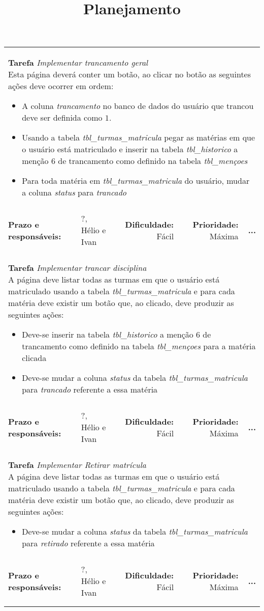 \documentclass{article}
\title{Planejamento}
\date{}
\newcommand{\pendente}{\textbf{...}}
\newenvironment{tarefas}{\begin{longtable}{llrrr}}{\end{longtable}}
\newcommand{\tarefa}[7]{
  \multicolumn{5}{l}{\parbox{15cm}{\textbf{Tarefa} \emph{#1}\\ #2}}
	\\\\\hline\textbf{Prazo e responsáveis:} & #3, #4 & \textbf{Dificuldade:} #5 & \textbf{Prioridade:} #6 & #7\\\hline\\
}
\begin{document}
  \maketitle
  \begin{tarefas}
	  \tarefa{Implementar trancamento geral}{
	    Esta página deverá conter um botão, ao clicar no botão as seguintes ações deve ocorrer em ordem:
	    \begin{itemize}
	      \item A coluna \textit{trancamento} no banco de dados do usuário que trancou deve ser definida como $1$.
	      \item Usando a tabela \textit{tbl\_turmas\_matricula} pegar as matérias em que o usuário está matriculado e inserir na tabela \textit{tbl\_historico} a menção $6$ de trancamento como definido na tabela \textit{tbl\_mençoes}
	      \item Para toda matéria em \textit{tbl\_turmas\_matricula} do usuário, mudar a coluna \textit{status} para \textit{trancado}
	    \end{itemize}
	  }{?}{Hélio e Ivan}{Fácil}{Máxima}{\pendente}
	  \tarefa{Implementar trancar disciplina}{
	    A página deve listar todas as turmas em que o usuário está matriculado usando a tabela \textit{tbl\_turmas\_matricula} e para cada matéria deve existir um botão que, ao clicado, deve produzir as seguintes ações:
	    \begin{itemize}
	      \item Deve-se inserir na tabela \textit{tbl\_historico} a menção $6$ de trancamento como definido na tabela \textit{tbl\_mençoes} para a matéria clicada
	      \item Deve-se mudar a coluna \textit{status} da tabela \textit{tbl\_turmas\_matricula} para \textit{trancado} referente a essa matéria
	    \end{itemize}
	  }{?}{Hélio e Ivan}{Fácil}{Máxima}{\pendente}
	  \tarefa{Implementar Retirar matrícula}{
	    A página deve listar todas as turmas em que o usuário está matriculado usando a tabela \textit{tbl\_turmas\_matricula} e para cada matéria deve existir um botão que, ao clicado, deve produzir as seguintes ações:
	    \begin{itemize}
	      \item Deve-se mudar a coluna \textit{status} da tabela \textit{tbl\_turmas\_matricula} para \textit{retirado} referente a essa matéria
	    \end{itemize}
	  }{?}{Hélio e Ivan}{Fácil}{Máxima}{\pendente}
	  \tarefa{Implementar Inserir menção}{
}
\end{tarefas}
\end{document}
